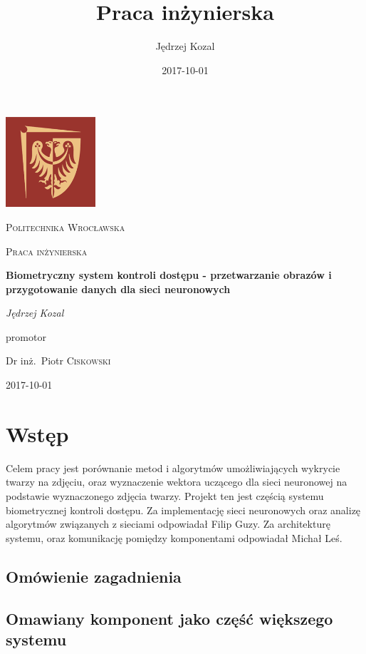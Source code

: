 \documentclass{article}
\title{Praca inżynierska}
\date{2017-10-01}
\author{Jędrzej Kozal}
\begin{document}
\begin{titlepage}
	\centering
	\includegraphics[width=0.25\textwidth]{logo_pol_wroclaw.png}\par\vspace{1cm}
	{\scshape\LARGE Politechnika Wrocławska \par}
	\vspace{1cm}
	{\scshape\Large Praca inżynierska\par}
	\vspace{1.5cm}
	{\huge\bfseries Biometryczny system kontroli dostępu - przetwarzanie obrazów i przygotowanie danych dla sieci neuronowych \par}
	\vspace{2cm}
	{\Large\itshape Jędrzej Kozal\par}
	\vfill
	promotor\par
	Dr inż.~Piotr \textsc{Ciskowski}

	\vfill

	{\large 2017-10-01\par}
\end{titlepage}


\section{Wstęp}
Celem pracy jest porównanie metod i algorytmów umożliwiających wykrycie twarzy na zdjęciu, oraz wyznaczenie wektora uczącego dla sieci neuronowej na podstawie wyznaczonego zdjęcia twarzy. Projekt ten jest częścią systemu biometrycznej kontroli dostępu. Za implementację sieci neuronowych oraz analizę algorytmów związanych z sieciami odpowiadał Filip Guzy. Za architekturę systemu, oraz komunikację pomiędzy komponentami odpowiadał Michał Leś.
\subsection{Omówienie zagadnienia}

\subsection{Omawiany komponent jako część większego systemu}
\end{document}
